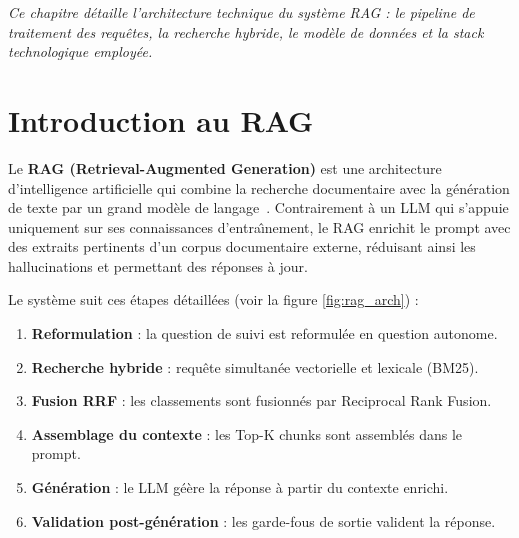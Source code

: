 \documentclass[12pt,a4paper,oneside]{report}
\newcommand{\chaptercolor}{mainblue}
\newcommand{\chapterabstract}[1]{\vspace{-0.5cm}\begin{center}\begin{minipage}{0.9\textwidth}\small\itshape\textcolor{\chaptercolor!70!black}{#1}\end{minipage}\end{center}\vspace{0.5cm}}
\begin{document}
\chapterabstract{Ce chapitre d\'{e}taille l'architecture technique du syst\`{e}me RAG : le pipeline de traitement des requ\^{e}tes, la recherche hybride, le mod\`{e}le de donn\'{e}es et la stack technologique employ\'{e}e.}



\section{Introduction au RAG}



Le \textbf{RAG (Retrieval-Augmented Generation)} est une architecture d'intelligence artificielle qui combine la recherche documentaire avec la g\'{e}n\'{e}ration de texte par un grand mod\`{e}le de langage~\cite{lewis2020rag}. Contrairement \`{a} un LLM qui s'appuie uniquement sur ses connaissances d'entra\^{\i}nement, le RAG enrichit le prompt avec des extraits pertinents d'un corpus documentaire externe, r\'{e}duisant ainsi les hallucinations et permettant des r\'{e}ponses \`{a} jour.



Le syst\`{e}me suit ces \'{e}tapes d\'{e}taill\'{e}es (voir la figure \ref{fig:rag_arch}) :



\begin{enumerate}[leftmargin=1.2cm]

\item \textbf{Reformulation} : la question de suivi est reformul\'{e}e en question autonome.

\item \textbf{Recherche hybride} : requ\^{e}te simultan\'{e}e vectorielle et lexicale (BM25).

\item \textbf{Fusion RRF} : les classements sont fusionn\'{e}s par Reciprocal Rank Fusion.

\item \textbf{Assemblage du contexte} : les Top-K chunks sont assembl\'{e}s dans le prompt.

\item \textbf{G\'{e}n\'{e}ration} : le LLM g\'{e}\`{e}re la r\'{e}ponse \`{a} partir du contexte enrichi.

\item \textbf{Validation post-g\'{e}n\'{e}ration} : les garde-fous de sortie valident la r\'{e}ponse.

\end{enumerate}
\end{document}
